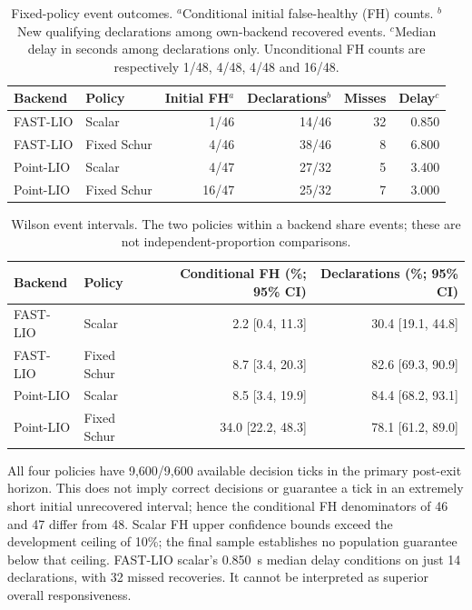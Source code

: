 \documentclass[11pt,a4paper]{article}
\begin{document}
\begin{table}[htbp]
\centering\small
\setlength{\tabcolsep}{5pt}
\begin{tabular}{@{}llrrrr@{}}
\toprule Backend & Policy & Initial FH$^{a}$ & Declarations$^{b}$ & Misses & Delay$^{c}$\\\midrule
FAST-LIO & Scalar & 1/46 & 14/46 & 32 & 0.850\\
FAST-LIO & Fixed Schur & 4/46 & 38/46 & 8 & 6.800\\
Point-LIO & Scalar & 4/47 & 27/32 & 5 & 3.400\\
Point-LIO & Fixed Schur & 16/47 & 25/32 & 7 & 3.000\\\bottomrule
\end{tabular}
\caption{Fixed-policy event outcomes. $^{a}$Conditional initial false-healthy
(FH) counts. $^{b}$New qualifying declarations among own-backend recovered
events. $^{c}$Median delay in seconds among declarations only. Unconditional
FH counts are respectively 1/48, 4/48, 4/48 and 16/48.}\label{tab:primary}
\end{table}

\begin{table}[htbp]
\centering\small
\begin{tabular}{@{}llrr@{}}
\toprule Backend & Policy & Conditional FH (\%; 95\% CI) & Declarations (\%; 95\% CI)\\\midrule
FAST-LIO & Scalar & 2.2 [0.4, 11.3] & 30.4 [19.1, 44.8]\\
FAST-LIO & Fixed Schur & 8.7 [3.4, 20.3] & 82.6 [69.3, 90.9]\\
Point-LIO & Scalar & 8.5 [3.4, 19.9] & 84.4 [68.2, 93.1]\\
Point-LIO & Fixed Schur & 34.0 [22.2, 48.3] & 78.1 [61.2, 89.0]\\\bottomrule
\end{tabular}
\caption{Wilson event intervals. The two policies within a backend share
events; these are not independent-proportion comparisons.}\label{tab:intervals}
\end{table}

All four policies have 9,600/9,600 available decision ticks in the primary
post-exit horizon. This does not imply correct decisions or guarantee a
tick in an extremely short initial unrecovered interval; hence the conditional
FH denominators of 46 and 47 differ from 48. Scalar FH upper confidence
bounds exceed the development ceiling of 10\%; the final sample establishes
no population guarantee below that ceiling. FAST-LIO scalar's 0.850~s
median delay conditions on just 14 declarations, with 32 missed recoveries.
It cannot be interpreted as superior overall responsiveness.
\end{document}
